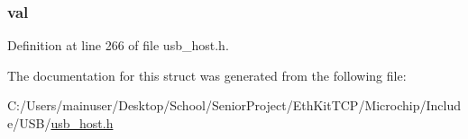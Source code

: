 \subsubsection[{val}]{ val}\label{struct___u_s_b___t_p_l_a5986ea8162aa0f6608b36b20964044dd}


Definition at line 266 of file usb\+\_\+host.\+h.



The documentation for this struct was generated from the following file\+:\begin{DoxyCompactItemize}
\item 
C\+:/\+Users/mainuser/\+Desktop/\+School/\+Senior\+Project/\+Eth\+Kit\+T\+C\+P/\+Microchip/\+Include/\+U\+S\+B/\hyperlink{usb__host_8h}{usb\+\_\+host.\+h}\end{DoxyCompactItemize}
